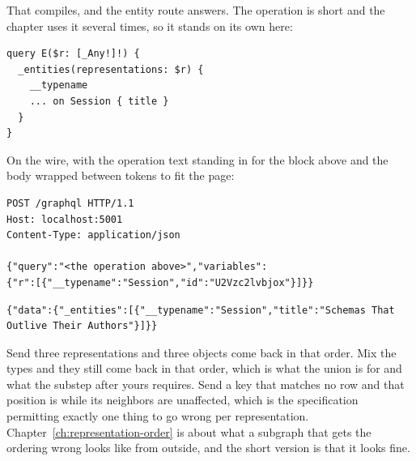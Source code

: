 %
That compiles, and the entity route answers. The operation is short and the
chapter uses it several times, so it stands on its own here:

\begin{verbatim}
query E($r: [_Any!]!) {
  _entities(representations: $r) {
    __typename
    ... on Session { title }
  }
}
\end{verbatim}

%
On the wire, with the operation text standing in for the block above and the
body wrapped between tokens to fit the page:

\begin{verbatim}
POST /graphql HTTP/1.1
Host: localhost:5001
Content-Type: application/json

{"query":"<the operation above>","variables":
{"r":[{"__typename":"Session","id":"U2Vzc2lvbjox"}]}}
\end{verbatim}

\begin{verbatim}
{"data":{"_entities":[{"__typename":"Session","title":"Schemas That Outlive Their Authors"}]}}
\end{verbatim}

%
Send three representations and three objects come back in that order. Mix the
types and they still come back in that order, which is what the union is for and
what the substep after yours requires. Send a key that matches no row and that
position is  while its neighbors are unaffected, which is the
specification permitting exactly one thing to go wrong per representation.
Chapter~\ref{ch:representation-order} is about what a subgraph that gets the
ordering wrong looks like from outside, and the short version is that it looks
fine.

